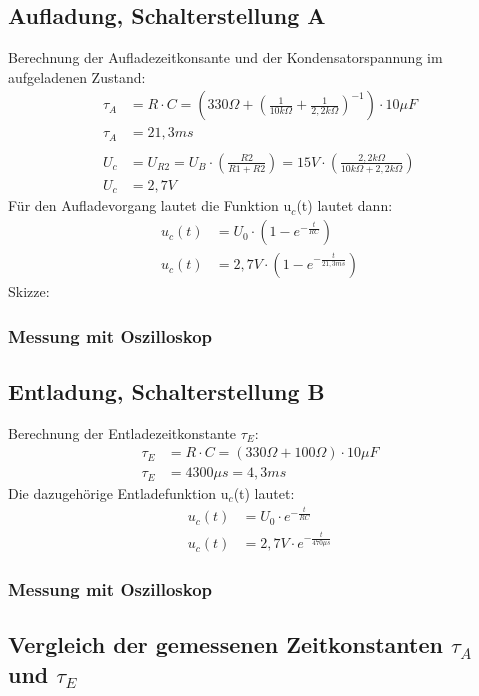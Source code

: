 \documentclass{article}
\begin{document}
\subsection{Aufladung, Schalterstellung A}
Berechnung der Aufladezeitkonsante und der Kondensatorspannung im aufgeladenen Zustand:
\begin{align*}
    \tau_A &= R\cdot C = (330\Omega + \left(\frac{1}{10k\Omega}+\frac{1}{2,2k\Omega}\right)^{-1}) \cdot 10\mu F\\
    \tau_A &= 21,3ms\\\\
    U_c &= U_{R2} = U_B \cdot \left(\frac{R2}{R1+R2}\right) = 15V \cdot \left(\frac{2,2k\Omega}{10k\Omega+2,2k\Omega}\right)\\
    U_c &= 2,7V
\end{align*}
Für den Aufladevorgang lautet die Funktion u$_c$(t) lautet dann:
\begin{align*}
    u_c(t)&= U_0 \cdot (1 - e^{-\frac{t}{RC}})\\
    u_c(t)&= 2,7V \cdot (1 - e^{-\frac{t}{21,3ms}})
\end{align*}
Skizze:
\subsubsection{Messung mit Oszilloskop}
 
\subsection{Entladung, Schalterstellung B}
Berechnung der Entladezeitkonstante $\tau_E$:
\begin{align*}
    \tau_E &= R\cdot C = (330\Omega + 100\Omega) \cdot 10\mu F \\
    \tau_E &= 4300\mu s = 4,3ms
\end{align*}
Die dazugehörige Entladefunktion u$_c$(t) lautet:
\begin{align*}
    u_c(t)&= U_0 \cdot e^{-\frac{t}{RC}}\\
    u_c(t)&= 2,7V \cdot e^{-\frac{t}{470\mu s}}
\end{align*}
\subsubsection{Messung mit Oszilloskop}
\subsection{Vergleich der gemessenen Zeitkonstanten $\tau_A$ und $\tau_E$}
\end{document}
